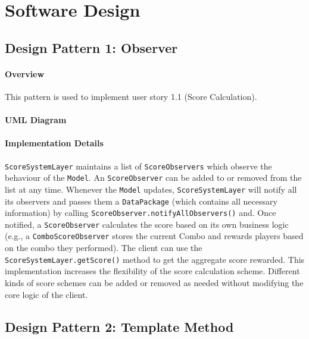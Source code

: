 \documentclass{article}
\begin{document}
\newpage

\section{Software Design}

\subsection{Design Pattern 1: Observer}

\paragraph{Overview}
This pattern is used to implement user story 1.1 (Score Calculation).

\paragraph{UML Diagram}\hfill

\begin{figure}[H]
    
\end{figure}

\paragraph{Implementation Details}

\verb`ScoreSystemLayer` maintains a list of \verb`ScoreObservers` which observe the behaviour of the \verb`Model`. An \verb`ScoreObserver` can be added to or removed from the list at any time. Whenever the \verb`Model` updates, \verb`ScoreSystemLayer` will notify all its observers and passes them a \verb|DataPackage| (which contains all necessary information) by calling \verb`ScoreObserver.notifyAllObservers()` and. Once notified, a \verb`ScoreObserver` calculates the score based on its own business logic (e.g., a \verb`ComboScoreObserver` stores the current Combo and rewards players based on the combo they performed). The client can use the \verb`ScoreSystemLayer.getScore()` method to get the aggregate score rewarded. This implementation increases the flexibility of the score calculation scheme. Different kinds of score schemes can be added or removed as needed without modifying the core logic of the client.

\clearpage

\subsection{Design Pattern 2: Template Method}
\end{document}
